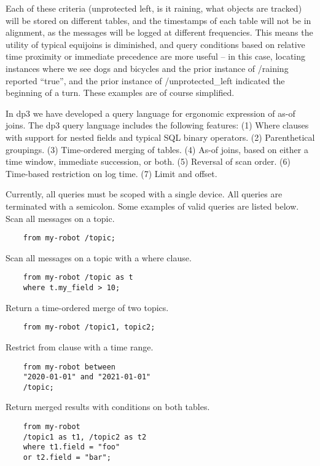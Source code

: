 \documentclass[9pt,twocolumn]{article}
\newcommand{\q}[1]{``#1''}
\begin{document}
    Each of these criteria (unprotected left, is it raining, what objects are
    tracked) will be stored on different tables, and the timestamps of each table
    will not be in alignment, as the messages will be logged at different
    frequencies. This means the utility of typical equijoins is diminished, and
    query conditions based on relative time proximity or immediate precedence are
    more useful – in this case, locating instances where we see dogs and bicycles
    and the prior instance of /raining reported \q{true}, and the prior instance of
    /unprotected\_left indicated the beginning of a turn. These examples are of
    course simplified.

    In dp3 we have developed a query language for ergonomic expression of as-of
    joins. The dp3 query language includes the following features: (1) Where
    clauses with support for nested fields and typical SQL binary operators. (2)
    Parenthetical groupings. (3) Time-ordered merging of tables. (4) As-of joins,
    based on either a time window, immediate succession, or both. (5) Reversal of
    scan order. (6) Time-based restriction on log time. (7) Limit and offset.

    Currently, all queries must be scoped with a single device. All queries are
    terminated with a semicolon. Some examples of valid queries are listed below. \\

    Scan all messages on a topic.
    \begin{lstlisting}
    from my-robot /topic;
    \end{lstlisting}

    Scan all messages on a topic with a where clause.
    \begin{lstlisting}
    from my-robot /topic as t
    where t.my_field > 10;
    \end{lstlisting}

    Return a time-ordered merge of two topics.
    \begin{lstlisting}
    from my-robot /topic1, topic2;
    \end{lstlisting}

    Restrict from clause with a time range.
    \begin{lstlisting}
    from my-robot between
    "2020-01-01" and "2021-01-01"
    /topic;
    \end{lstlisting}

    Return merged results with conditions on both tables.
    \begin{lstlisting}
    from my-robot
    /topic1 as t1, /topic2 as t2
    where t1.field = "foo"
    or t2.field = "bar";
    \end{lstlisting}
\end{document}
